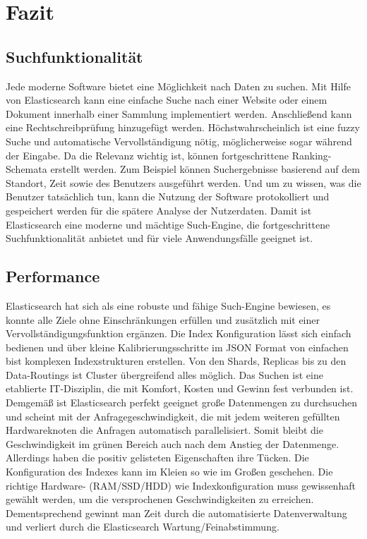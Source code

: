 \section{Fazit}
\subsection{Suchfunktionalität}
Jede moderne Software bietet eine Möglichkeit nach Daten zu suchen. Mit Hilfe von Elasticsearch kann eine einfache Suche nach einer Website oder einem Dokument innerhalb einer Sammlung implementiert werden. Anschließend kann eine Rechtschreibprüfung hinzugefügt werden. Höchstwahrscheinlich ist eine fuzzy Suche und automatische Vervollständigung nötig, möglicherweise sogar während der Eingabe. Da die Relevanz wichtig ist, können fortgeschrittene Ranking-Schemata erstellt werden. Zum Beispiel können Suchergebnisse basierend auf dem Standort, Zeit sowie des Benutzers ausgeführt werden. Und um zu wissen, was die Benutzer tatsächlich tun, kann die Nutzung der Software protokolliert und gespeichert werden für die spätere Analyse der Nutzerdaten.
\newline
Damit ist Elasticsearch eine moderne und mächtige Such-Engine, die fortgeschrittene Suchfunktionalität anbietet und für viele Anwendungsfälle geeignet ist.

\subsection{Performance}
Elasticsearch hat sich als eine robuste und fähige Such-Engine bewiesen, es konnte alle Ziele ohne Einschränkungen erfüllen und zusätzlich mit einer Vervollständigungsfunktion ergänzen. Die Index Konfiguration lässt sich einfach bedienen und über kleine Kalibrierungsschritte im JSON Format von einfachen bist komplexen Indexstrukturen erstellen. Von den Shards, Replicas bis zu den Data-Routings ist Cluster übergreifend alles möglich. Das Suchen ist eine etablierte IT-Disziplin, die mit Komfort, Kosten und Gewinn fest verbunden ist. Demgemäß ist Elasticsearch perfekt geeignet große Datenmengen zu durchsuchen und scheint mit der Anfragegeschwindigkeit, die mit jedem weiteren gefüllten Hardwareknoten die Anfragen automatisch parallelisiert. 
Somit bleibt die Geschwindigkeit im grünen Bereich auch nach dem Anstieg der Datenmenge.  
Allerdings haben die positiv gelisteten Eigenschaften ihre Tücken. Die Konfiguration des Indexes kann im Kleien so wie im Großen geschehen. Die richtige Hardware- (RAM/SSD/HDD) wie Indexkonfiguration muss gewissenhaft gewählt werden, um die versprochenen Geschwindigkeiten zu erreichen. Dementsprechend gewinnt man Zeit durch die automatisierte Datenverwaltung und verliert durch die Elasticsearch Wartung/Feinabstimmung. 

